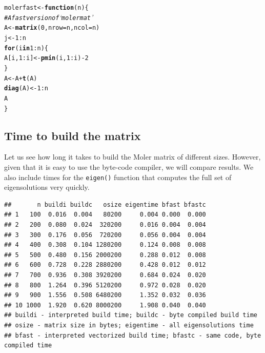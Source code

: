 \documentclass[10pt]{article}\usepackage[]{graphicx}\usepackage[]{color}
\makeatletter
\newcommand{\hlnum}[1]{\textcolor[rgb]{0.686,0.059,0.569}{#1}}%
\newcommand{\hlcom}[1]{\textcolor[rgb]{0.678,0.584,0.686}{\textit{#1}}}%
\newcommand{\hlopt}[1]{\textcolor[rgb]{0,0,0}{#1}}%
\newcommand{\hlstd}[1]{\textcolor[rgb]{0.345,0.345,0.345}{#1}}%
\newcommand{\hlkwa}[1]{\textcolor[rgb]{0.161,0.373,0.58}{\textbf{#1}}}%
\newcommand{\hlkwb}[1]{\textcolor[rgb]{0.69,0.353,0.396}{#1}}%
\newcommand{\hlkwc}[1]{\textcolor[rgb]{0.333,0.667,0.333}{#1}}%
\newcommand{\hlkwd}[1]{\textcolor[rgb]{0.737,0.353,0.396}{\textbf{#1}}}%
\newenvironment{kframe}{%
 \def\at@end@of@kframe{}%
 \ifinner\ifhmode%
  \def\at@end@of@kframe{\end{minipage}}%
  \begin{minipage}{\columnwidth}%
 \fi\fi%
 \def\FrameCommand##1{\hskip\@totalleftmargin \hskip-\fboxsep
 \colorbox{shadecolor}{##1}\hskip-\fboxsep
     \hskip-\linewidth \hskip-\@totalleftmargin \hskip\columnwidth}%
 \MakeFramed {\advance\hsize-\width
   \@totalleftmargin\z@ \linewidth\hsize
   \@setminipage}}%
 {\par\unskip\endMakeFramed%
 \at@end@of@kframe}
\newenvironment{knitrout}{}{} %
\newcommand{\code}[1]{{\tt #1}}
\makeatother
\begin{document}
\begin{knitrout}\scriptsize
{}\color{fgcolor}\begin{kframe}
\begin{alltt}
\hlstd{molerfast} \hlkwb{<-} \hlkwa{function}\hlstd{(}\hlkwc{n}\hlstd{) \{}
\hlcom{# A fast version of `molermat'}
\hlstd{A} \hlkwb{<-} \hlkwd{matrix}\hlstd{(}\hlnum{0}\hlstd{,} \hlkwc{nrow} \hlstd{= n,} \hlkwc{ncol} \hlstd{= n)}
\hlstd{j} \hlkwb{<-} \hlnum{1}\hlopt{:}\hlstd{n}
\hlkwa{for} \hlstd{(i} \hlkwa{in} \hlnum{1}\hlopt{:}\hlstd{n) \{}
\hlstd{A[i,} \hlnum{1}\hlopt{:}\hlstd{i]} \hlkwb{<-} \hlkwd{pmin}\hlstd{(i,} \hlnum{1}\hlopt{:}\hlstd{i)} \hlopt{-} \hlnum{2}
\hlstd{\}}
\hlstd{A} \hlkwb{<-} \hlstd{A} \hlopt{+} \hlkwd{t}\hlstd{(A)}
\hlkwd{diag}\hlstd{(A)} \hlkwb{<-} \hlnum{1}\hlopt{:}\hlstd{n}
\hlstd{A}
\hlstd{\}}
\end{alltt}
\end{kframe}
\end{knitrout}

\subsection{Time to build the matrix}

Let us see how long it takes to build the Moler matrix of different sizes.
However, given that it is easy to use the byte-code compiler, we will compare
results. We also include times for the \code{eigen()} function that computes
the full set of eigensolutions very quickly.

\begin{knitrout}\scriptsize
{}\color{fgcolor}\begin{kframe}


{\ttfamily\noindent\itshape\color{messagecolor}{\#\# Loading required package: compiler}}\end{kframe}
\end{knitrout}

\begin{knitrout}\scriptsize
{}\color{fgcolor}\begin{kframe}
\begin{verbatim}
##       n buildi buildc   osize eigentime bfast bfastc
## 1   100  0.016  0.004   80200     0.004 0.000  0.000
## 2   200  0.080  0.024  320200     0.016 0.004  0.004
## 3   300  0.176  0.056  720200     0.056 0.004  0.004
## 4   400  0.308  0.104 1280200     0.124 0.008  0.008
## 5   500  0.480  0.156 2000200     0.288 0.012  0.008
## 6   600  0.728  0.228 2880200     0.428 0.012  0.012
## 7   700  0.936  0.308 3920200     0.684 0.024  0.020
## 8   800  1.264  0.396 5120200     0.972 0.028  0.020
## 9   900  1.556  0.508 6480200     1.352 0.032  0.036
## 10 1000  1.920  0.620 8000200     1.908 0.040  0.040
## buildi - interpreted build time; buildc - byte compiled build time
## osize - matrix size in bytes; eigentime - all eigensolutions time
## bfast - interpreted vectorized build time; bfastc - same code, byte compiled time
\end{verbatim}
\end{kframe}
\end{knitrout}
\end{document}
